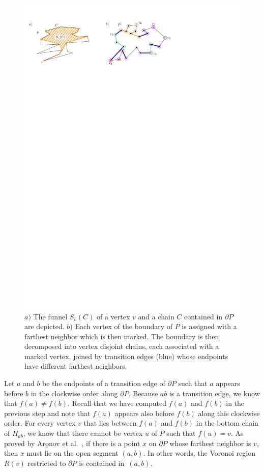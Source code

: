 \documentclass[a4paper,UKenglish]{lipics}
\newcommand{\fn}[2]{\ensuremath{S_{\scriptscriptstyle #1}(#2)}}
\newcommand{\ff}[1]{\ensuremath{f(#1)}}
\begin{document}
\begin{figure}[tb]
\centering
\includegraphics{img/MarkedVertices.pdf}

\caption{\small 
$a)$ The funnel $\fn{v}{C}$ of a vertex $v$ and a chain $C$ contained in $\partial P$ are depicted.
$b)$ Each vertex of the boundary of $P$ is assigned with a farthest neighbor which is then marked. 
The boundary is then decomposed into vertex disjoint chains, each associated with a marked vertex, joined by transition edges (blue) whose endpoints have different farthest neighbors.}
\label{fig:Marked vertices decomposition}
\end{figure}

Let $a$ and $b$ be the endpoints of a transition edge of $\partial P$ such that $a$ appears before $b$ in the clockwise order along $\partial P$. Because $ab$ is a transition edge, we know that $\ff{a}\neq \ff{b}$.
Recall that we have computed $\ff{a}$ and $\ff{b}$ in the previous step and note that $\ff{a}$ appears also before $\ff{b}$ along this clockwise order. 
For every vertex $v$ that lies between $\ff{a}$ and $\ff{b}$ in the bottom chain of $H_{ab}$, we know that there cannot be vertex $u$ of $P$ such that $\ff{u} = v$.
As proved by Aronov et al.~\cite[Corollary 2.7.4]{aronov1993furthest}, 
if there is a point $x$ on $\partial P$ whose farthest neighbor is $v$, then $x$ must lie on the open segment $(a,b)$. 
In other words, the Voronoi region $R(v)$ restricted to $\partial P$ is contained in~$(a,b)$.
\end{document}
